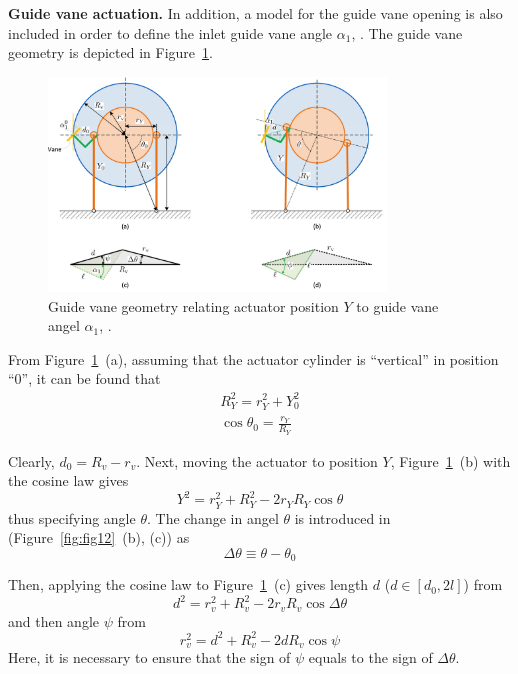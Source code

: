 \documentclass[%
]{USN-PhD}
\begin{document}
\textbf{Guide vane actuation.} In addition, a model for the guide vane opening is also included in order to define the inlet guide vane angle $\alpha_1$, \cite{LieL:18}. The guide vane geometry is depicted in Figure~\ref{fig:fig13}.
\begin{figure}
\begin{center}
\includegraphics[width=0.8\textwidth]{fig/Guide_vane} %
\caption{Guide vane geometry relating actuator position $Y$ to guide vane angel $\alpha_1$, \cite{LieL:18}.}
\label{fig:fig13}
\end{center}
\end{figure}

From Figure~\ref{fig:fig13}~(a), assuming that the actuator cylinder is ``vertical'' in position ``0'', it can be found that
\begin{equation}
\begin{array}{c}
{R}_Y^2=r_Y^2+Y_0^2 \\
\cos\theta_0=\frac{r_Y}{R_Y}
\end{array}
\end{equation}

Clearly, $d_0=R_v-r_v$. Next, moving the actuator to position $Y$, Figure~\ref{fig:fig13}~(b) with the cosine law gives
\begin{equation}
Y^2=r_Y^2+R_Y^2-2r_YR_Y\cos\theta
\end{equation}
thus specifying angle $\theta$. The change in angel $\theta$ is introduced in (Figure~\ref{fig:fig12}~(b), (c)) as
\begin{equation}
\Delta\theta\equiv\theta-\theta_0
\end{equation}

Then, applying the cosine law to Figure~\ref{fig:fig13}~(c) gives length $d$ ($d\in[d_0,2l]$) from
\begin{equation}
d^2=r_v^2+R_v^2-2r_vR_v\cos\Delta\theta
\end{equation}
and then angle $\psi$ from
\begin{equation}
r_v^2=d^2+R_v^2-2dR_v\cos\psi
\end{equation}
Here, it is necessary to ensure that the sign of $\psi$ equals to the sign of $\Delta\theta$.
\end{document}
